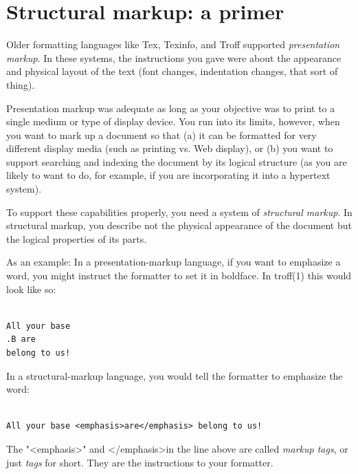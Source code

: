 \documentclass[pdftex,english,a4paper,10pt]{infocom}
\begin{document}
\section{Structural markup: a primer}
\label{id2767054}\hypertarget{id2767054}{}%

Older formatting languages like Tex, Texinfo, and Troff
supported {\em presentation
markup}.  In these systems, the instructions you
gave were about the appearance and physical layout of the text (font
changes, indentation changes, that sort of thing).

Presentation markup was adequate as long as your objective was
to print to a single medium or type of display device.  You run into
its limits, however, when you want to mark up a document so that (a)
it can be formatted for very different display media (such as printing
vs. Web display), or (b) you want to support searching and indexing the
document by its logical structure (as you are likely to want to do,
for example, if you are incorporating it into a hypertext system).

To support these capabilities properly, you need a system of
{\em structural markup}.  In structural markup, you describe not
the physical appearance of the document but the logical properties of
its parts.

As an example: In a presentation-markup language, if you want to
emphasize a word, you might instruct the formatter to set it in
boldface.  In
troff(1)
this would look like so:

\begin{Verbatim}[]

All your base
.B are
belong to us!

\end{Verbatim}

In a structural-markup language, you would tell the formatter to
emphasize the word:

\begin{Verbatim}[]

All your base <emphasis>are</emphasis> belong to us!

\end{Verbatim}

 The "\textless{}emphasis\textgreater{}" and \textless{}/emphasis\textgreater{}in the line above
are called {\em markup
tags},
or just {\em tags} for short.  They are the
instructions to your formatter.
\end{document}
